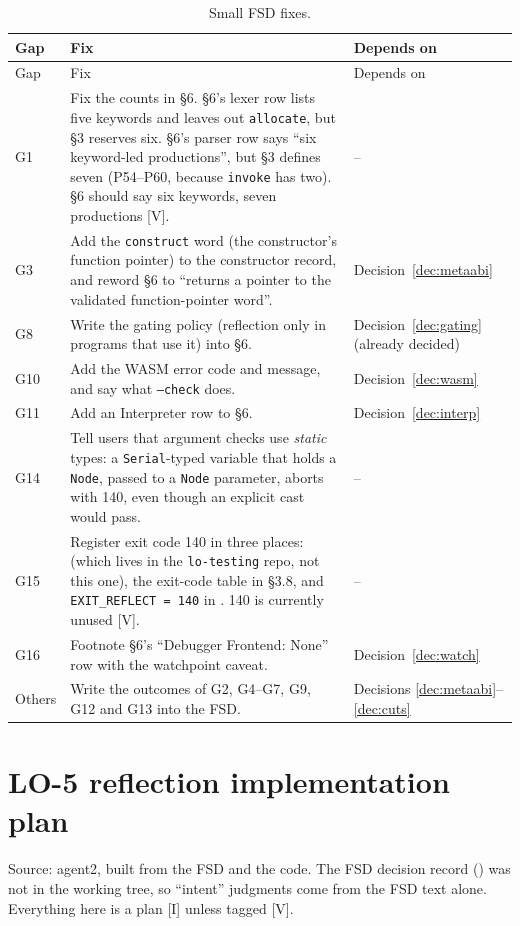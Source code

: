 \documentclass[10pt]{article}
\newcommand{\code}[1]{\texttt{\small #1}}
\newcommand{\mV}{\textsf{\scriptsize[V]}}
\newcommand{\mI}{\textsf{\scriptsize[I]}}
\begin{document}
\begin{xltabular}{\linewidth}{@{}L{1.1cm}Y L{2.6cm}@{}}
\caption{Small FSD fixes.}\label{tab:fsdfixes}\\
\toprule
Gap & Fix & Depends on \\
\midrule
\endfirsthead
\toprule Gap & Fix & Depends on \\ \midrule
\endhead
G1 & Fix the counts in §6. §6's lexer row lists five keywords and leaves out \code{allocate}, but §3 reserves six. §6's parser row says ``six keyword-led productions'', but §3 defines seven (P54--P60, because \code{invoke} has two). §6 should say six keywords, seven productions \mV. & -- \\
G3 & Add the \code{construct} word (the constructor's function pointer) to the constructor record, and reword §6 to ``returns a pointer to the validated function-pointer word''. & Decision~\ref{dec:metaabi} \\
G8 & Write the gating policy (reflection only in programs that use it) into §6. & Decision~\ref{dec:gating} (already decided) \\
G10 & Add the WASM error code and message, and say what \code{--check} does. & Decision~\ref{dec:wasm} \\
G11 & Add an Interpreter row to §6. & Decision~\ref{dec:interp} \\
G14 & Tell users that argument checks use \emph{static} types: a \code{Serial}-typed variable that holds a \code{Node}, passed to a \code{Node} parameter, aborts with 140, even though an explicit cast would pass. & -- \\
G15 & Register exit code 140 in three places:  (which lives in the \code{lo-testing} repo, not this one), the exit-code table in  §3.8, and \code{EXIT\_REFLECT = 140} in . 140 is currently unused \mV. & -- \\
G16 & Footnote §6's ``Debugger Frontend: None'' row with the watchpoint caveat. & Decision~\ref{dec:watch} \\
Others & Write the outcomes of G2, G4--G7, G9, G12 and G13 into the FSD. & Decisions \ref{dec:metaabi}--\ref{dec:cuts} \\
\bottomrule
\end{xltabular}


\section{LO-5 reflection implementation plan}\label{sec:lo5}
Source: agent2, built from the FSD and the code. The FSD decision record () was not in the working tree, so ``intent'' judgments come from the FSD text alone. Everything here is a plan \mI{} unless tagged \mV.
\end{document}
